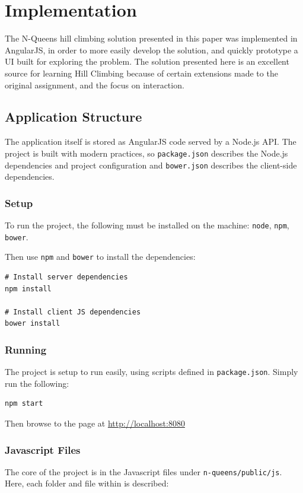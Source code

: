 \section{Implementation}
\label{section:implementation}
The N-Queens hill climbing solution presented in this paper was implemented in AngularJS, in order to more easily
develop the solution, and quickly prototype a UI built for exploring the problem. The solution presented here is an
excellent source for learning Hill Climbing because of certain extensions made to the original assignment, and the
focus on interaction.

\subsection{Application Structure}
The application itself is stored as AngularJS code served by a Node.js API. The project is built with modern practices,
so \texttt{package.json} describes the Node.js dependencies and project configuration and \texttt{bower.json} describes
the client-side dependencies.

\subsubsection{Setup}
To run the project, the following must be installed on the machine:
\texttt{node}\cite{node}, \texttt{npm}\cite{npm}, \texttt{bower}\cite{bower}.

Then use \texttt{npm} and \texttt{bower} to install the dependencies:

\begin{lstlisting}
# Install server dependencies
npm install

# Install client JS dependencies
bower install
\end{lstlisting}

\subsubsection{Running}
The project is setup to run easily, using scripts defined in \texttt{package.json}. Simply run the following:

\begin{lstlisting}
npm start
\end{lstlisting}

Then browse to the page at \url{http://localhost:8080}

\subsubsection{Javascript Files}
The core of the project is in the Javascript files under \texttt{n-queens/public/js}. Here, each folder and file within
is described:

